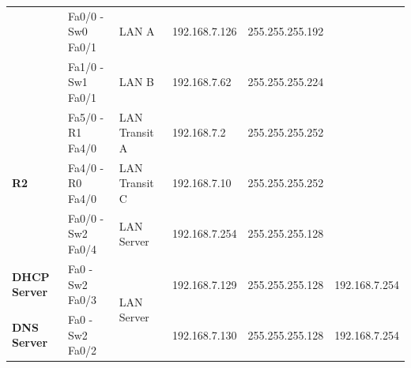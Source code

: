 \documentclass[11pt,a4paper]{report}
\begin{document}
\begin{center}
\begin{longtable}{@{}llllll@{}}
                                                                   & Fa0/0 - Sw0 Fa0/1                                        & LAN A                                                 & 192.168.7.126                                    & 255.255.255.192                                           &                                                       \\
                                                                   & Fa1/0 - Sw1 Fa0/1                                        & LAN B                                                 & 192.168.7.62                                     & 255.255.255.224                                           &                                                       \\* \midrule
                \multirow{3}{*}{\textbf{R2}}                       & Fa5/0 - R1 Fa4/0                                         & LAN Transit A                                         & 192.168.7.2                                      & 255.255.255.252                                           &                                                       \\
                                                                   & Fa4/0 - R0 Fa4/0                                         & LAN Transit C                                         & 192.168.7.10                                     & 255.255.255.252                                           &                                                       \\
                                                                   & Fa0/0 - Sw2 Fa0/4                                        & LAN Server                                            & 192.168.7.254                                    & 255.255.255.128                                           &                                                       \\* \midrule
                \textbf{DHCP Server}                               & Fa0 - Sw2 Fa0/3                                          & \multirow{3}{*}{LAN Server}                           & 192.168.7.129                                    & 255.255.255.128                                           & 192.168.7.254                                         \\
                \textbf{DNS Server}                                & Fa0 - Sw2 Fa0/2                                          &                                                       & 192.168.7.130                                    & 255.255.255.128                                           & 192.168.7.254                                         \\

\end{longtable}
\end{center}
\end{document}
